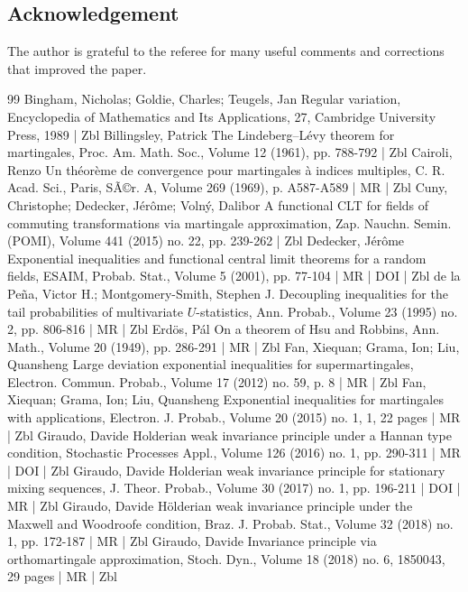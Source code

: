 \documentclass[10pt]{amsart}
\theoremstyle{definition}\newtheorem{defi}[theo]{Definition}\newtheorem{rema}[theo]{Remark}\newtheorem{exam}[theo]{Example}\newtheorem{exem}[theo]{Example}\newtheorem{nota}[theo]{Notation}
\begin{document}
\subsection*{Acknowledgement}
The author is grateful to the referee for many useful comments and corrections that improved the paper.


\begin{thebibliography}{99}
 Bingham, Nicholas; Goldie, Charles; Teugels, Jan Regular variation, Encyclopedia of Mathematics and Its Applications, 27, Cambridge University Press, 1989 | Zbl
 Billingsley, Patrick The Lindeberg–Lévy theorem for martingales, Proc. Am. Math. Soc., Volume 12 (1961), pp. 788-792 | Zbl
 Cairoli, Renzo Un théorème de convergence pour martingales à indices multiples, C. R. Acad. Sci., Paris, SÃ©r. A, Volume 269 (1969), p. A587-A589 | MR | Zbl
 Cuny, Christophe; Dedecker, Jérôme; Volný, Dalibor A functional CLT for fields of commuting transformations via martingale approximation, Zap. Nauchn. Semin. (POMI), Volume 441 (2015) no. 22, pp. 239-262 | Zbl
 Dedecker, Jérôme Exponential inequalities and functional central limit theorems for a random fields, ESAIM, Probab. Stat., Volume 5 (2001), pp. 77-104 | MR | DOI | Zbl
 de la Peña, Victor H.; Montgomery-Smith, Stephen J. Decoupling inequalities for the tail probabilities of multivariate $U$-statistics, Ann. Probab., Volume 23 (1995) no. 2, pp. 806-816 | MR | Zbl
 Erdös, Pál On a theorem of Hsu and Robbins, Ann. Math., Volume 20 (1949), pp. 286-291 | MR | Zbl
 Fan, Xiequan; Grama, Ion; Liu, Quansheng Large deviation exponential inequalities for supermartingales, Electron. Commun. Probab., Volume 17 (2012) no. 59, p. 8 | MR | Zbl
 Fan, Xiequan; Grama, Ion; Liu, Quansheng Exponential inequalities for martingales with applications, Electron. J. Probab., Volume 20 (2015) no. 1, 1, 22 pages | MR | Zbl
 Giraudo, Davide Holderian weak invariance principle under a Hannan type condition, Stochastic Processes Appl., Volume 126 (2016) no. 1, pp. 290-311 | MR | DOI | Zbl
 Giraudo, Davide Holderian weak invariance principle for stationary mixing sequences, J. Theor. Probab., Volume 30 (2017) no. 1, pp. 196-211 | DOI | MR | Zbl
 Giraudo, Davide Hölderian weak invariance principle under the Maxwell and Woodroofe condition, Braz. J. Probab. Stat., Volume 32 (2018) no. 1, pp. 172-187 | MR | Zbl
 Giraudo, Davide Invariance principle via orthomartingale approximation, Stoch. Dyn., Volume 18 (2018) no. 6, 1850043, 29 pages | MR | Zbl

\end{thebibliography}
\end{document}

